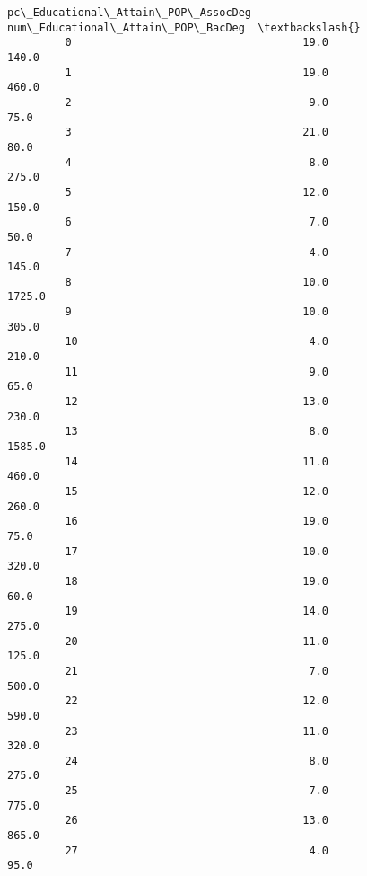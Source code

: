 \documentclass[11pt]{article}
\begin{document}
\begin{Verbatim}[commandchars=\\\{\}]
                pc\_Educational\_Attain\_POP\_AssocDeg  num\_Educational\_Attain\_POP\_BacDeg  \textbackslash{}
         0                                    19.0                              140.0   
         1                                    19.0                              460.0   
         2                                     9.0                               75.0   
         3                                    21.0                               80.0   
         4                                     8.0                              275.0   
         5                                    12.0                              150.0   
         6                                     7.0                               50.0   
         7                                     4.0                              145.0   
         8                                    10.0                             1725.0   
         9                                    10.0                              305.0   
         10                                    4.0                              210.0   
         11                                    9.0                               65.0   
         12                                   13.0                              230.0   
         13                                    8.0                             1585.0   
         14                                   11.0                              460.0   
         15                                   12.0                              260.0   
         16                                   19.0                               75.0   
         17                                   10.0                              320.0   
         18                                   19.0                               60.0   
         19                                   14.0                              275.0   
         20                                   11.0                              125.0   
         21                                    7.0                              500.0   
         22                                   12.0                              590.0   
         23                                   11.0                              320.0   
         24                                    8.0                              275.0   
         25                                    7.0                              775.0   
         26                                   13.0                              865.0   
         27                                    4.0                               95.0   

\end{Verbatim}
\end{document}
